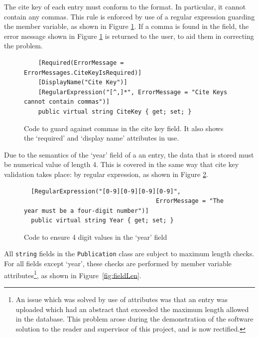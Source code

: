 The cite key of each entry must conform to the \bibtex{} format.  In particular, it cannot contain any commas.  This rule is enforced by use of a regular expression guarding the member variable, as shown in Figure \ref{fig:ckGuard}.  If a comma is found in the field, the error message shown in Figure \ref{fig:ckGuard} is returned to the user, to aid them in correcting the problem.

\begin{figure}
	\begin{center}
			\lstset{language=CSharp} 
			\begin{lstlisting}
	[Required(ErrorMessage = ErrorMessages.CiteKeyIsRequired)]
	[DisplayName("Cite Key")]
	[RegularExpression("[^,]*", ErrorMessage = "Cite Keys cannot contain commas")]
	public virtual string CiteKey { get; set; }
			\end{lstlisting}
		\caption{Code to guard against commas in the cite key field. It also shows the `required' and `display name' attributes in use.}
		\label{fig:ckGuard}
	\end{center}
\end{figure}

Due to the semantics of the `year' field of a an entry, the data that is stored must be numerical value of length 4.  This is covered in the same way that cite key validation takes place: by regular expression, as shown in Figure \ref{fig:yearGuard}.

\begin{figure}
	\begin{center}
			\lstset{language=CSharp} 
			\begin{lstlisting}
  [RegularExpression("[0-9][0-9][0-9][0-9]", 
  									 ErrorMessage = "The year must be a four-digit number")]
  public virtual string Year { get; set; }
			\end{lstlisting}
		\caption{Code to ensure 4 digit values in the `year' field}
		\label{fig:yearGuard}
	\end{center}
\end{figure}

All \texttt{string} fields in the \texttt{Publication} class are subject to maximum length checks. For all fields except `year', these checks are performed by member variable attributes\footnote{An issue which was solved by use of attributes was that an entry was uploaded which had an abstract that exceeded the maximum length allowed in the database.  This problem arose during the demonstration of the software solution to the reader and supervisor of this project, and is now rectified.}, as shown in Figure~\ref{fig:fieldLen}.

